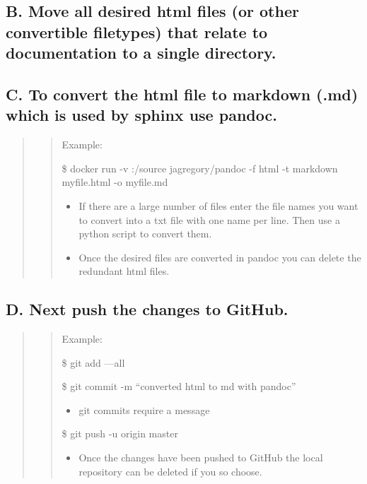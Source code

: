 \documentclass[letterpaper,10pt,english]{sphinxmanual}
\begin{document}
\subsection{B. Move all desired html files (or other convertible filetypes) that relate to documentation to a single directory.}
\label{docs/Process:b-move-all-desired-html-files-or-other-convertible-filetypes-that-relate-to-documentation-to-a-single-directory}

\subsection{C. To convert the html file to markdown (.md) which is used by sphinx use pandoc.}
\label{docs/Process:c-to-convert-the-html-file-to-markdown-md-which-is-used-by-sphinx-use-pandoc}\begin{quote}
\begin{quote}

Example:

\$ docker run -v :/source jagregory/pandoc -f html -t markdown myfile.html -o myfile.md
\begin{itemize}
\item {} 
If there are a large number of files enter the file names you want to convert into a txt file with one name per line. Then use a python script to convert them.

\item {} 
Once the desired files are converted in pandoc you can delete the redundant html files.

\end{itemize}
\end{quote}
\end{quote}


\subsection{D. Next push the changes to GitHub.}
\label{docs/Process:d-next-push-the-changes-to-github}\begin{quote}
\begin{quote}

Example:

\$ git add —all

\$ git commit -m “converted html to md with pandoc”
\begin{itemize}
\item {} 
git commits require a message

\end{itemize}

\$ git push -u origin master
\begin{itemize}
\item {} 
Once the changes have been pushed to GitHub the local repository can be deleted if you so choose.

\end{itemize}
\end{quote}
\end{quote}
\end{document}
